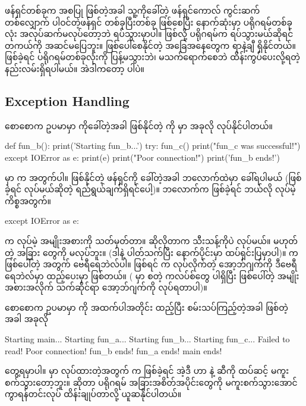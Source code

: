 ဖန်ရှင်တစ်ခုက အစပြု  ဖြစ်တဲ့အခါ သူ့ကိုခေါ်တဲ့ ဖန်ရှင်ကောလ် ကွင်းဆက်  တစ်လျှောက် ပါဝင်တဲ့ဖန်ရှင် တစ်ခုပြီးတစ်ခု  ဖြစ်စေပြီး နောက်ဆုံးမှာ ပရိုဂရမ်တစ်ခုလုံး အလုပ်ဆက်မလုပ်တော့ဘဲ ရပ်သွားမှာပါ။  ဖြစ်လို့ ပရိုဂရမ်က ရပ်သွားမယ်ဆိုရင် တကယ်ကို အဆင်မပြေဘူး။  ဖြစ်ပေါ်စေနိုင်တဲ့ အခြေအနေတွေက ရာနဲ့ချီ ရှိနိုင်တယ်။  ဖြစ်ခဲ့ရင်  ပရိုဂရမ်တစ်ခုလုံးကို ပြန့်မသွားဘဲ၊ မသက်ရောက်စေဘဲ ထိန်းကွပ်ပေးလို့ရတဲ့ နည်းလမ်းရှိရပါမယ်။ အဲဒါကတော့  ပါပဲ။ 

\subsection*{Exception Handling}
စောစောက ဥပမာမှာ  ကိုခေါ်တဲ့အခါ ဖြစ်နိုင်တဲ့  ကို  မှာ အခုလို  လုပ်နိုင်ပါတယ်။ 

%
\begin{py}
def fun_b():
    print('Starting fun_b...')
    try:
        fun_c()
        print("fun_c was successful!")
    except IOError as e:
        print(e)
        print("Poor connection!")
    print('fun_b ends!')
\end{py}
%
 မှာ  က  အတွက်ပါ။  ဖြစ်နိုင်တဲ့ ဖန်ရှင်ကို ခေါ်တဲ့အခါ  ဘလောက်ထဲမှာ ခေါ်ရပါမယ် (ဖြစ်ခဲ့ရင်  လုပ်မယ်ဆိုတဲ့ ရည်ရွယ်ချက်ရှိရင်ပေါ့)။  ဘလောက်က  ဖြစ်ခဲ့ရင် ဘယ်လို  လုပ်မဲ့ ကိစ္စအတွက်။

%
\begin{py}
except IOError as e:
\end{py}
%
 က  လုပ်မဲ့  အမျိုးအစားကို သတ်မှတ်တာ။ ဆိုလိုတာက  သီးသန့်ကိုပဲ  လုပ်မယ်။  မဟုတ်တဲ့ အခြား  တွေကို  မလုပ်ဘူး။ (ဒါနဲ့ ပါတ်သက်ပြီး နောက်ပိုင်းမှာ ထပ်ရှင်းပြမှာပါ)။  က ဖြစ်ပေါ်တဲ့   အတွက် ဗေရီရေဘဲလ်ပါ။  ဖြစ်ရင်  က  လုပ်လိုက်တဲ့  အော့ဘ်ဂျက်ကို ဒီဗေရီရေဘဲလ်မှာ ထည့်ပေးမှာ ဖြစ်တယ်။ ( မှာ \fEn{,} \fEn{,}  စတဲ့ ကလပ်စ်တွေ ပါရှိပြီး ဖြစ်ပေါ်တဲ့  အမျိုးအစားအလိုက် သက်ဆိုင်ရာ အော့ဘ်ဂျက်ကို  လုပ်ရတာပါ)။

စောစောက ဥပမာမှာ  ကို အထက်ပါအတိုင်း   ထည့်ပြီး စမ်းသပ်ကြည့်တဲ့အခါ  ဖြစ်တဲ့အခါ အခုလို
\begin{codetxt}
Starting main...
Starting fun_a...
Starting fun_b...
Starting fun_c...
Failed to read!
Poor connection!
fun_b ends!
fun_a ends!
main ends!
\end{codetxt}
တွေ့ရမှာပါ။  မှာ  လုပ်ထားတဲ့အတွက်   က  ဖြစ်ခဲ့ရင် အဲ့ဒီ  ဟာ  နဲ့  ဆီကို ထပ်ဆင့် မကူးစက်သွားတော့ဘူး။  ဆိုတာ ပရိုဂရမ် အခြားအစိတ်အပိုင်းတွေကို  မကူးစက်သွားအောင် ကွာရန်တင်းလုပ် ထိန်းချုပ်တာလို့ ယူဆနိုင်ပါတယ်။ 

